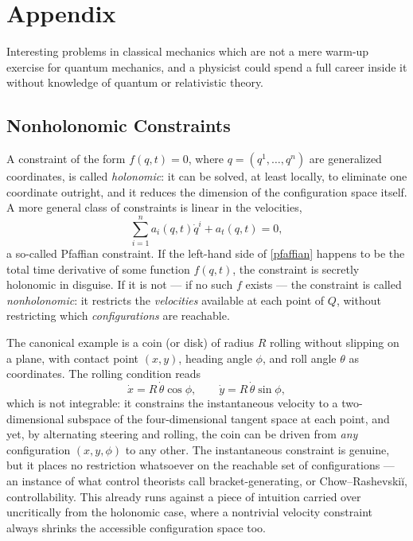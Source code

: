 \chapter{Appendix}
\label{ap}

Interesting problems in classical mechanics which are not
 a mere warm-up exercise for quantum mechanics,
and a physicist could spend a full career inside it without 
knowledge of quantum or relativistic theory.


\section{Nonholonomic Constraints}
\label{ap:nh}

A constraint of the form $f(q,t)=0$, where $q=(q^1,\dots,q^n)$ are
generalized coordinates, is called \emph{holonomic}: it can be
solved, at least locally, to eliminate one coordinate outright, and
it reduces the dimension of the configuration space itself. A more
general class of constraints is linear in the velocities,
\begin{equation}
  \sum_{i=1}^n a_i(q,t) \dot q^i + a_t(q,t) = 0,
  \label{pfaffian}
\end{equation}
a so-called Pfaffian constraint. If the left-hand side of
\eqref{pfaffian} happens to be the total time derivative of some
function $f(q,t)$, the constraint is secretly holonomic in disguise.
If it is not --- if no such $f$ exists --- the constraint is called
\emph{nonholonomic}: it restricts the \emph{velocities} available at
each point of $Q$, without restricting which \emph{configurations}
are reachable.

The canonical example is a coin (or disk) of radius $R$ rolling
without slipping on a plane, with contact point $(x,y)$, heading
angle $\phi$, and roll angle $\theta$ as coordinates. The
rolling condition reads
\begin{equation*}
  \dot x = R\,\dot\theta\cos\phi ,\qquad
  \dot y = R\,\dot\theta\sin\phi ,
\end{equation*}
which is not integrable: it constrains the instantaneous velocity to
a two-dimensional subspace of the four-dimensional tangent space at
each point, and yet, by alternating steering and rolling, the coin
can be driven from \emph{any} configuration $(x,y,\phi)$ to any
other. The instantaneous constraint is genuine, but it places no
restriction whatsoever on the reachable set of configurations --- an
instance of what control theorists call bracket-generating, or
Chow--Rashevski\u{i}, controllability. This already runs against a
piece of intuition carried over uncritically from the holonomic
case, where a nontrivial velocity constraint always shrinks the
accessible configuration space too.

